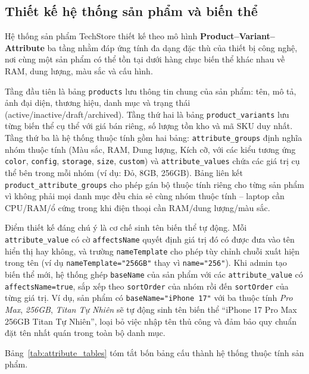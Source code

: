 \subsection{Thiết kế hệ thống sản phẩm và biến thể}
\label{sec:c3_product_variant}

Hệ thống sản phẩm TechStore thiết kế theo mô hình \textbf{Product--Variant--Attribute} ba tầng nhằm đáp ứng tính đa dạng đặc thù của thiết bị công nghệ, nơi cùng một sản phẩm có thể tồn tại dưới hàng chục biến thể khác nhau về RAM, dung lượng, màu sắc và cấu hình.

\begin{sloppypar}
Tầng đầu tiên là bảng \texttt{products} lưu thông tin chung của sản phẩm: tên, mô tả, ảnh đại diện, thương hiệu, danh mục và trạng thái (active/inactive/draft/archived). Tầng thứ hai là bảng \texttt{product\_variants} lưu từng biến thể cụ thể với giá bán riêng, số lượng tồn kho và mã SKU duy nhất. Tầng thứ ba là hệ thống thuộc tính gồm hai bảng: \texttt{attribute\_groups} định nghĩa nhóm thuộc tính (Màu sắc, RAM, Dung lượng, Kích cỡ, với các kiểu tương ứng \texttt{color}, \texttt{config}, \texttt{storage}, \texttt{size}, \texttt{custom}) và \texttt{attribute\_values} chứa các giá trị cụ thể bên trong mỗi nhóm (ví dụ: Đỏ, 8GB, 256GB). Bảng liên kết \texttt{product\_attribute\_groups} cho phép gán bộ thuộc tính riêng cho từng sản phẩm vì không phải mọi danh mục đều chia sẻ cùng nhóm thuộc tính -- laptop cần CPU/RAM/ổ cứng trong khi điện thoại cần RAM/dung lượng/màu sắc.

Điểm thiết kế đáng chú ý là cơ chế sinh tên biến thể tự động. Mỗi \texttt{attribute\_value} có cờ \texttt{affectsName} quyết định giá trị đó có được đưa vào tên hiển thị hay không, và trường \texttt{nameTemplate} cho phép tùy chỉnh chuỗi xuất hiện trong tên (ví dụ \texttt{nameTemplate="256GB"} thay vì \texttt{name="256"}). Khi admin tạo biến thể mới, hệ thống ghép \texttt{baseName} của sản phẩm với các \texttt{attribute\_value} có \texttt{affectsName=true}, sắp xếp theo \texttt{sortOrder} của nhóm rồi đến \texttt{sortOrder} của từng giá trị. Ví dụ, sản phẩm có \texttt{baseName="iPhone 17"} với ba thuộc tính \textit{Pro Max}, \textit{256GB}, \textit{Titan Tự Nhiên} sẽ tự động sinh tên biến thể ``iPhone 17 Pro Max 256GB Titan Tự Nhiên'', loại bỏ việc nhập tên thủ công và đảm bảo quy chuẩn đặt tên nhất quán trong toàn bộ danh mục.
\end{sloppypar}

Bảng~\ref{tab:attribute_tables} tóm tắt bốn bảng cấu thành hệ thống thuộc tính sản phẩm.

